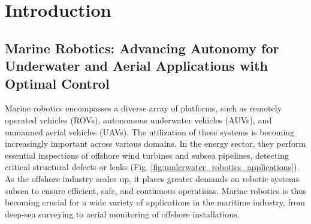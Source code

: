 \chapter{Introduction}















\section{Marine Robotics: Advancing Autonomy for Underwater and Aerial Applications with Optimal Control}

Marine robotics encompasses a diverse array of platforms, such as remotely operated vehicles (ROVs), autonomous underwater vehicles (AUVs), and unmanned aerial vehicles (UAVs). The utilization of these systems is becoming increasingly important across various domains. In the energy sector, they perform essential inspections of offshore wind turbines and subsea pipelines, detecting critical structural defects or leaks (Fig. \ref{fig:underwater_robotics_applications}). As the offshore industry scales up, it places greater demands on robotic systems subsea to ensure efficient, safe, and continuous operations. Marine robotics is thus becoming crucial for a wide variety of applications in the maritime industry, from deep-sea surveying to aerial monitoring of offshore installations.

